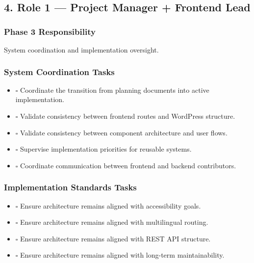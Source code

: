 \documentclass[12pt,a4paper]{article}
\providecommand{\tightlist}{\setlength{\itemsep}{0pt}\setlength{\parskip}{0pt}}
\begin{document}
\subsection{4. Role 1 --- Project Manager + Frontend Lead}\label{role-1-project-manager-frontend-lead}

\subsubsection{Phase 3 Responsibility}\label{phase-3-responsibility}

System coordination and implementation oversight.

\subsubsection{System Coordination Tasks}\label{system-coordination-tasks}

\begin{itemize}
\tightlist
\item
  \(\square\) Coordinate the transition from planning documents into active implementation.
\item
  \(\square\) Validate consistency between frontend routes and WordPress structure.
\item
  \(\square\) Validate consistency between component architecture and user flows.
\item
  \(\square\) Supervise implementation priorities for reusable systems.
\item
  \(\square\) Coordinate communication between frontend and backend contributors.
\end{itemize}

\subsubsection{Implementation Standards Tasks}\label{implementation-standards-tasks}

\begin{itemize}
\tightlist
\item
  \(\square\) Ensure architecture remains aligned with accessibility goals.
\item
  \(\square\) Ensure architecture remains aligned with multilingual routing.
\item
  \(\square\) Ensure architecture remains aligned with REST API structure.
\item
  \(\square\) Ensure architecture remains aligned with long-term maintainability.
\end{itemize}
\end{document}
